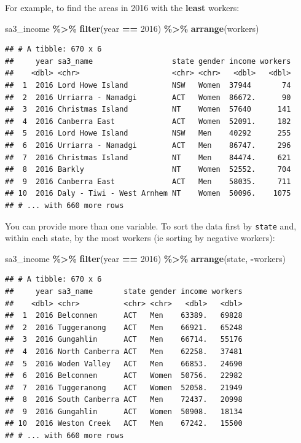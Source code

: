 \documentclass[
]{book}
\newenvironment{Shaded}{\begin{snugshade}}{\end{snugshade}}
\newcommand{\DecValTok}[1]{\textcolor[rgb]{0.00,0.00,0.81}{#1}}
\newcommand{\KeywordTok}[1]{\textcolor[rgb]{0.13,0.29,0.53}{\textbf{#1}}}
\newcommand{\NormalTok}[1]{#1}
\newcommand{\OperatorTok}[1]{\textcolor[rgb]{0.81,0.36,0.00}{\textbf{#1}}}
\newcommand{\StringTok}[1]{\textcolor[rgb]{0.31,0.60,0.02}{#1}}
\begin{document}
For example, to find the areas in 2016 with the \textbf{least} workers:

\begin{Shaded}
\begin{Highlighting}[]
\NormalTok{sa3\_income }\OperatorTok{\%\textgreater{}\%}
\StringTok{  }\KeywordTok{filter}\NormalTok{(year }\OperatorTok{==}\StringTok{ }\DecValTok{2016}\NormalTok{) }\OperatorTok{\%\textgreater{}\%}\StringTok{ }
\StringTok{  }\KeywordTok{arrange}\NormalTok{(workers)}
\end{Highlighting}
\end{Shaded}

\begin{verbatim}
## # A tibble: 670 x 6
##     year sa3_name                  state gender income workers
##    <dbl> <chr>                     <chr> <chr>   <dbl>   <dbl>
##  1  2016 Lord Howe Island          NSW   Women  37944       74
##  2  2016 Urriarra - Namadgi        ACT   Women  86672.      90
##  3  2016 Christmas Island          NT    Women  57640      141
##  4  2016 Canberra East             ACT   Women  52091.     182
##  5  2016 Lord Howe Island          NSW   Men    40292      255
##  6  2016 Urriarra - Namadgi        ACT   Men    86747.     296
##  7  2016 Christmas Island          NT    Men    84474.     621
##  8  2016 Barkly                    NT    Women  52552.     704
##  9  2016 Canberra East             ACT   Men    58035.     711
## 10  2016 Daly - Tiwi - West Arnhem NT    Women  50096.    1075
## # ... with 660 more rows
\end{verbatim}

You can provide more than one variable. To sort the data first by \texttt{state} and, within each state, by the most workers (ie sorting by negative workers):

\begin{Shaded}
\begin{Highlighting}[]
\NormalTok{sa3\_income }\OperatorTok{\%\textgreater{}\%}
\StringTok{  }\KeywordTok{filter}\NormalTok{(year }\OperatorTok{==}\StringTok{ }\DecValTok{2016}\NormalTok{) }\OperatorTok{\%\textgreater{}\%}\StringTok{ }
\StringTok{  }\KeywordTok{arrange}\NormalTok{(state, }\OperatorTok{{-}}\NormalTok{workers)}
\end{Highlighting}
\end{Shaded}

\begin{verbatim}
## # A tibble: 670 x 6
##     year sa3_name       state gender income workers
##    <dbl> <chr>          <chr> <chr>   <dbl>   <dbl>
##  1  2016 Belconnen      ACT   Men    63389.   69828
##  2  2016 Tuggeranong    ACT   Men    66921.   65248
##  3  2016 Gungahlin      ACT   Men    66714.   55176
##  4  2016 North Canberra ACT   Men    62258.   37481
##  5  2016 Woden Valley   ACT   Men    66853.   24690
##  6  2016 Belconnen      ACT   Women  50756.   22982
##  7  2016 Tuggeranong    ACT   Women  52058.   21949
##  8  2016 South Canberra ACT   Men    72437.   20998
##  9  2016 Gungahlin      ACT   Women  50908.   18134
## 10  2016 Weston Creek   ACT   Men    67242.   15500
## # ... with 660 more rows
\end{verbatim}
\end{document}
